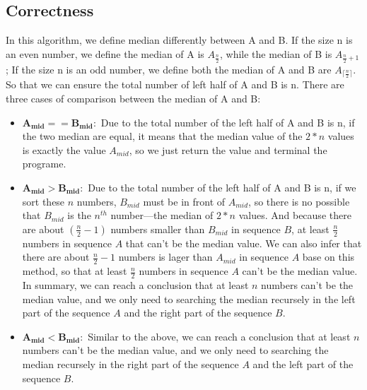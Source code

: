 \documentclass[UTF8,a4paper]{article}
\begin{document}
	\subsection{Correctness}
		In this algorithm, we define median differently between A and B. If the size n is an even number, we define the median of A is $ A_{\frac{n}{2}} $, while the median of B is $ A_{\frac{n}{2}+1} $; If the size n is an odd number, we define both the median of A and B are $ A_{\lceil \frac{n}{2} \rceil} $. So that we can ensure the total number of left half of A and B is n.
		There are three cases of comparison between the median of A and B:
		\begin{itemize}
			\item $\bm{ A_{mid}==B_{mid} :}$  Due to the total number of the left half of A and B is n, if the two median are equal, it means that the median value of the $ 2*n $ values is exactly the value  $ A_{mid} $, so we just return the value and terminal the programe.
			\item $\bm{ A_{mid}>B_{mid} :}$ Due to the total number of the left half of A and B is n, if we sort these $ n $ numbers, $ B_{mid} $ must be in front of $ A_{mid} $, so there is no possible that $ B_{mid} $ is the $ n^{th} $ number---the median of $ 2*n $ values. And because there are about $ (\frac{n}{2}-1) $ numbers smaller than $ B_{mid} $ in sequence $ B $, at least $ \frac{n}{2} $ numbers in sequence $ A $ that can't be the median value. 
			We can also infer that there are about $ \frac{n}{2}-1 $ numbers is lager than $ A_{mid} $ in sequence $A$ base on this method, so that at least $ \frac{n}{2} $ numbers in sequence $ A $ can't be the median value. 
			In summary, we can reach a conclusion that at least $ n $ numbers can't be the median value, and we only need to searching the median recursely in the left part of the sequence $ A $ and the right part of the sequence $ B $.
			\item $\bm{A_{mid}<B_{mid} : }$ Similar to the above, we can reach a conclusion that at least $ n $ numbers can't be the median value, and we only need to searching the median recursely in the right part of the sequence $ A $ and the left part of the sequence $ B $.
		\end{itemize}
		
\end{document}
